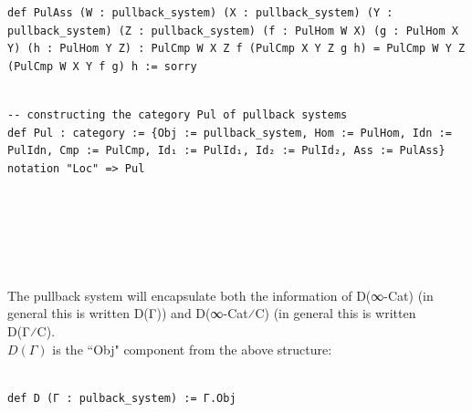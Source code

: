 \documentclass{book}
\theoremstyle{definition}
\newcounter{pcounter}
\newcounter{lcounter}
\newcounter{sectioncount}
\newcounter{subsectioncount}
\renewcommand{\section}[1]{\newpage\ \\ \ \\ \begin{center} \scalebox{1.5}{\texttt{\thesectioncount . #1}} \stepcounter{sectioncount} \setcounter{subsectioncount}{1} \end{center} \begin{center} \ \\ \ \\ \thispagestyle{empty} \end{center}}
\begin{document}
{{\begin{center}
\begin{tcolorbox}[width=5in,colback={white},title={\begin{center}\texttt{Lean \thelcounter} \addtocounter{lcounter}{1}  \end{center}},colbacktitle=Blue,coltitle=black]
\begin{verbatim}
def PulAss (W : pullback_system) (X : pullback_system) (Y : pullback_system) (Z : pullback_system) (f : PulHom W X) (g : PulHom X Y) (h : PulHom Y Z) : PulCmp W X Z f (PulCmp X Y Z g h) = PulCmp W Y Z (PulCmp W X Y f g) h := sorry

\end{verbatim}
\end{tcolorbox}
\end{center}

\begin{center}
\begin{tcolorbox}[width=5in,colback={white},title={\begin{center}\texttt{Lean \thelcounter} \addtocounter{lcounter}{1}  \end{center}},colbacktitle=Blue,coltitle=black]
\begin{verbatim}

-- constructing the category Pul of pullback systems
def Pul : category := {Obj := pullback_system, Hom := PulHom, Idn := PulIdn, Cmp := PulCmp, Id₁ := PulId₁, Id₂ := PulId₂, Ass := PulAss}
notation "Loc" => Pul

\end{verbatim}
\end{tcolorbox}
\end{center}

\section{$\texttt{D}$}

The pullback system will encapsulate both the information of D(∞-Cat) (in general this is written D(Γ)) and D(∞-Cat⁄C) (in general this is written D(Γ⁄C).\\

$D(Γ)$ is the ``Obj" component from the above structure:

\begin{center}
\begin{tcolorbox}[width=5in,colback={white},title={\begin{center}\texttt{Lean \thelcounter} \addtocounter{lcounter}{1}  \end{center}},colbacktitle=Blue,coltitle=black]
\begin{verbatim}

def D (Γ : pulback_system) := Γ.Obj

\end{verbatim}
\end{tcolorbox}
\end{center}

}}
\end{document}
